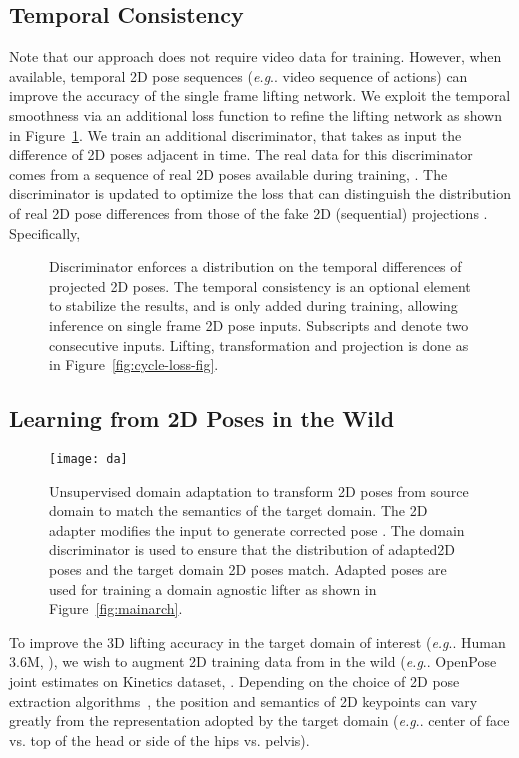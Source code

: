 \documentclass[10pt,twocolumn,letterpaper]{article}
\makeatletter
\DeclareRobustCommand\onedot{\futurelet\@let@token\@onedot}
\def\@onedot{\ifx\@let@token.\else.\null\fi\xspace}
\def\eg{\emph{e.g}\onedot} \def\Eg{\emph{E.g}\onedot}
\makeatother
\begin{document}
\subsection{Temporal Consistency}
\label{subsect:temporal_consistency}
Note that our approach does not require video data for training. However, when available, temporal 2D pose sequences (\eg video sequence of actions) can improve the accuracy of the single frame lifting network. We exploit the temporal smoothness via an additional loss function to refine the lifting network  as shown in Figure~\ref{fig:temporal_consistency}. We train an additional discriminator,  that takes as input the difference of 2D poses adjacent in time. The real data for this discriminator comes from a sequence of real 2D poses available during training, . The discriminator  is updated to optimize the loss that can distinguish the distribution of real 2D pose differences from those of the fake 2D (sequential) projections  . Specifically,



\begin{figure}

\caption{
	Discriminator  enforces a distribution on the temporal differences of projected 2D poses. The temporal consistency is an optional element to stabilize the results, and is only added during training, allowing inference on single frame 2D pose inputs. Subscripts  and  denote two consecutive inputs. Lifting, transformation and projection is done as in Figure~\ref{fig:cycle-loss-fig}.}
\label{fig:temporal_consistency}
\end{figure}


\subsection{Learning from 2D Poses in the Wild}
\label{subsect:domain_adaptation}
\begin{figure}[htb]
	\centering
\texttt{[image: da]}
	\caption{Unsupervised domain adaptation to transform 2D poses from source domain to match the semantics of the target domain. The 2D adapter modifies the input  to generate corrected pose . The domain discriminator is used to ensure that the distribution of adapted2D poses  and the target domain 2D poses  match. Adapted poses  are used for training a domain agnostic lifter as shown in Figure~\ref{fig:mainarch}.}
	\label{fig:da}
\end{figure}

To improve the 3D lifting accuracy in the target domain of interest (\eg Human 3.6M, ), we wish to augment 2D training data from in the wild (\eg OpenPose joint estimates on Kinetics dataset, . Depending on the choice of 2D pose extraction algorithms~\cite{OpenPose,stacked-hourglass,cpm}, the position and semantics of 2D keypoints can vary greatly from the representation adopted by the target domain (\eg center of face vs. top of the head or side of the hips vs. pelvis).
	
\end{document}
